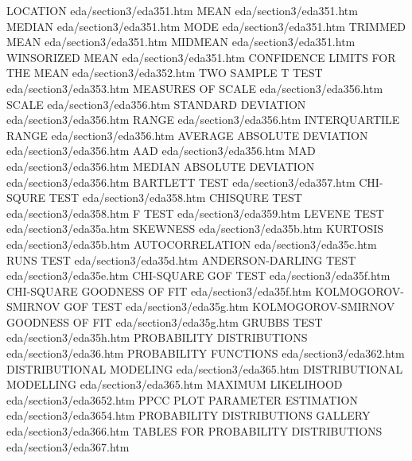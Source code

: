 LOCATION                                eda/section3/eda351.htm
MEAN                                    eda/section3/eda351.htm
MEDIAN                                  eda/section3/eda351.htm
MODE                                    eda/section3/eda351.htm
TRIMMED MEAN                            eda/section3/eda351.htm
MIDMEAN                                 eda/section3/eda351.htm
WINSORIZED MEAN                         eda/section3/eda351.htm
CONFIDENCE LIMITS FOR THE MEAN          eda/section3/eda352.htm
TWO SAMPLE T TEST                       eda/section3/eda353.htm
MEASURES OF SCALE                       eda/section3/eda356.htm
SCALE                                   eda/section3/eda356.htm
STANDARD DEVIATION                      eda/section3/eda356.htm
RANGE                                   eda/section3/eda356.htm
INTERQUARTILE RANGE                     eda/section3/eda356.htm
AVERAGE ABSOLUTE DEVIATION              eda/section3/eda356.htm
AAD                                     eda/section3/eda356.htm
MAD                                     eda/section3/eda356.htm
MEDIAN ABSOLUTE DEVIATION               eda/section3/eda356.htm
BARTLETT TEST                           eda/section3/eda357.htm
CHI-SQURE TEST                          eda/section3/eda358.htm
CHISQURE TEST                           eda/section3/eda358.htm
F TEST                                  eda/section3/eda359.htm
LEVENE TEST                             eda/section3/eda35a.htm
SKEWNESS                                eda/section3/eda35b.htm
KURTOSIS                                eda/section3/eda35b.htm
AUTOCORRELATION                         eda/section3/eda35c.htm
RUNS TEST                               eda/section3/eda35d.htm
ANDERSON-DARLING TEST                   eda/section3/eda35e.htm
CHI-SQUARE GOF TEST                     eda/section3/eda35f.htm
CHI-SQUARE GOODNESS OF FIT              eda/section3/eda35f.htm
KOLMOGOROV-SMIRNOV GOF TEST             eda/section3/eda35g.htm
KOLMOGOROV-SMIRNOV GOODNESS OF FIT      eda/section3/eda35g.htm
GRUBBS TEST                             eda/section3/eda35h.htm
PROBABILITY DISTRIBUTIONS               eda/section3/eda36.htm
PROBABILITY FUNCTIONS                   eda/section3/eda362.htm
DISTRIBUTIONAL MODELING                 eda/section3/eda365.htm
DISTRIBUTIONAL MODELLING                eda/section3/eda365.htm
MAXIMUM LIKELIHOOD                      eda/section3/eda3652.htm
PPCC PLOT PARAMETER ESTIMATION          eda/section3/eda3654.htm
PROBABILITY DISTRIBUTIONS GALLERY       eda/section3/eda366.htm
TABLES FOR PROBABILITY DISTRIBUTIONS    eda/section3/eda367.htm
